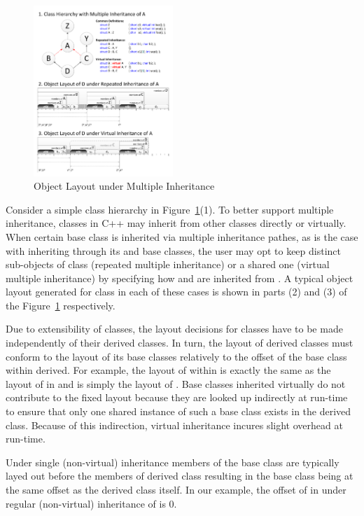 \begin{figure}[htbp]
  \centering
    \includegraphics[width=0.47\textwidth]{Classes.pdf}
  \caption{Object Layout under Multiple Inheritance}
  \label{fig:objlayout}
\end{figure}

Consider a simple class hierarchy in Figure~\ref{fig:objlayout}(1). To better 
support multiple inheritance, classes in C++ may inherit from other classes 
directly or virtually. When certain base class is inherited via multiple 
inheritance pathes, as is the case with  inheriting  through its 
 and  base classes, the user may opt to keep distinct 
sub-objects of class  (repeated multiple inheritance) or a shared one 
(virtual multiple inheritance) by specifying how  and  are 
inherited from . A typical object layout generated for class  in 
each of these cases is shown in parts (2) and (3) of the 
Figure~\ref{fig:objlayout} respectively.

Due to extensibility of classes, the layout decisions for classes have to be 
made independently of their derived classes. In turn, the layout of derived 
classes must conform to the layout of its base classes relatively to the offset 
of the base class within derived. For example, the layout of  within 
 is exactly the same as the layout of  in  and is simply 
the layout of . Base classes inherited virtually do not contribute to 
the fixed layout because they are looked up indirectly at run-time to ensure 
that only one shared instance of such a base class exists in the derived class. 
Because of this indirection, virtual inheritance incures slight overhead at 
run-time.

Under single (non-virtual) inheritance members of the base class are typically 
layed out before the members of derived class resulting in the base class being 
at the same offset as the derived class itself. In our example, the offset 
of  in  under regular (non-virtual) inheritance of  is 0.  

